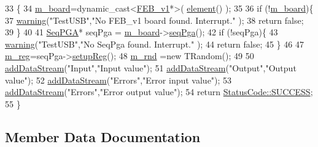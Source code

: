 \begin{DoxyCode}
33                                  \{
34   \hyperlink{classTestUSB_ab4a5317f74feb30410d4c1ad75ad192c}{m\_board}=\textcolor{keyword}{dynamic\_cast<}\hyperlink{classFEB__v1}{FEB\_v1}*\textcolor{keyword}{>}( \hyperlink{classProcessus_a6fe155527431a7190b7d44d600b9608d}{element}() );
35   
36   \textcolor{keywordflow}{if} (!\hyperlink{classTestUSB_ab4a5317f74feb30410d4c1ad75ad192c}{m\_board})\{
37     \hyperlink{classObject_a65cd4fda577711660821fd2cd5a3b4c9}{warning}(\textcolor{stringliteral}{"TestUSB"},\textcolor{stringliteral}{"No FEB\_v1 board found. Interrupt."}  );
38     \textcolor{keywordflow}{return} \textcolor{keyword}{false};
39   \}
40 
41   \hyperlink{classSeqPGA}{SeqPGA}* seqPga = \hyperlink{classTestUSB_ab4a5317f74feb30410d4c1ad75ad192c}{m\_board}->\hyperlink{classFEB__v1_a8bf655504f9b0c51d5aa5bc6b30da00d}{seqPga}();
42   \textcolor{keywordflow}{if} (!seqPga)\{
43     \hyperlink{classObject_a65cd4fda577711660821fd2cd5a3b4c9}{warning}(\textcolor{stringliteral}{"TestUSB"},\textcolor{stringliteral}{"No SeqPga found. Interrupt."}  );
44     \textcolor{keywordflow}{return} \textcolor{keyword}{false};
45   \}
46   
47   \hyperlink{classTestUSB_a5f2bd3ef5db056bcfd803cb94d3a6587}{m\_reg}=seqPga->\hyperlink{classSeqPGA_a83598ab914c8e3ee5afa34c5e6e7fdf4}{setupReg}();
48   \hyperlink{classTestUSB_ac3ad0c22af51e67455f919474a658dbe}{m\_rnd} =\textcolor{keyword}{new} TRandom();
49 
50   \hyperlink{classProcessus_a308c8f193802f1d1ab49d4447d0cb281}{addDataStream}(\textcolor{stringliteral}{"Input"},\textcolor{stringliteral}{"Input value"});
51   \hyperlink{classProcessus_a308c8f193802f1d1ab49d4447d0cb281}{addDataStream}(\textcolor{stringliteral}{"Output"},\textcolor{stringliteral}{"Output value"});
52   \hyperlink{classProcessus_a308c8f193802f1d1ab49d4447d0cb281}{addDataStream}(\textcolor{stringliteral}{"Errors"},\textcolor{stringliteral}{"Error input value"});
53   \hyperlink{classProcessus_a308c8f193802f1d1ab49d4447d0cb281}{addDataStream}(\textcolor{stringliteral}{"Errors"},\textcolor{stringliteral}{"Error output value"});
54   \textcolor{keywordflow}{return} \hyperlink{classStatusCode_a6f565cbeadc76d14c72f047e5e85eb4badd0da38d3ba0d922efd1f4619bc37ad8}{StatusCode::SUCCESS};
55 \}
\end{DoxyCode}


\subsection{Member Data Documentation}
\mbox{\label{classTestUSB_a91e2b4e7057340ff77a799f16730a8fd}} 
